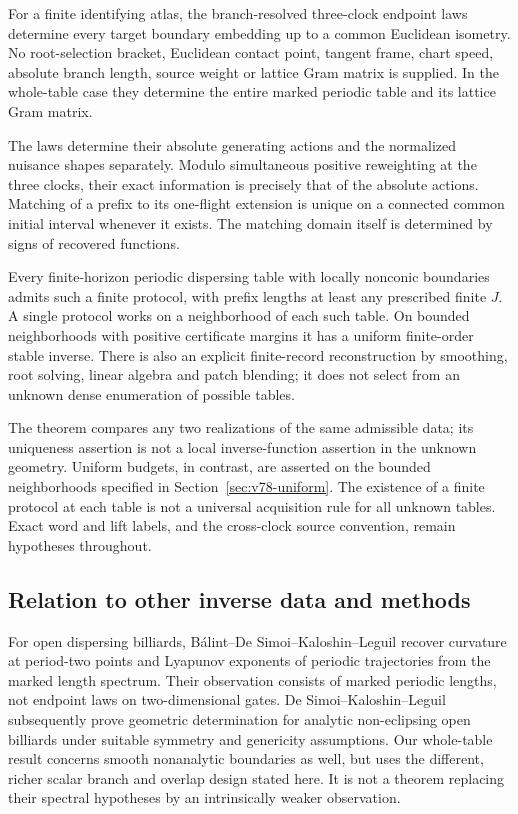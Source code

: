 \begin{theorem}
\label{thm:v78-main}\label{thm:v77-main}
For a finite identifying atlas, the branch-resolved three-clock endpoint
laws determine every target boundary embedding up to a common Euclidean
isometry.  No root-selection bracket, Euclidean contact point, tangent
frame, chart speed, absolute branch length, source weight or lattice
Gram matrix is supplied.  In the whole-table case they determine the
entire marked periodic table and its lattice Gram matrix.

The laws determine their absolute generating actions and the normalized
nuisance shapes separately.  Modulo simultaneous positive reweighting
at the three clocks, their exact information is precisely that of the
absolute actions.  Matching of a prefix to its one-flight extension is
unique on a connected common initial interval whenever it exists.
The matching domain itself is determined by signs of recovered functions.

Every finite-horizon periodic dispersing table with locally nonconic
boundaries admits such a finite protocol, with prefix lengths at least
any prescribed finite $J$.  A single protocol works on a neighborhood
of each such table.  On bounded neighborhoods with positive certificate
margins it has a uniform finite-order stable inverse.  There is also an
explicit finite-record reconstruction by smoothing, root solving,
linear algebra and patch blending; it does not select from an unknown
dense enumeration of possible tables.
\end{theorem}

The theorem compares any two realizations of the same admissible data;
its uniqueness assertion is not a local inverse-function assertion in
the unknown geometry.  Uniform budgets, in contrast, are asserted on the
bounded neighborhoods specified in Section~\ref{sec:v78-uniform}.
The existence of a finite protocol at each table is not a universal
acquisition rule for all unknown tables.  Exact word and lift labels,
and the cross-clock source convention, remain hypotheses throughout.

\subsection{Relation to other inverse data and methods}

For open dispersing billiards, B\'alint--De Simoi--Kaloshin--Leguil
\cite{BalintDeSimoiKaloshinLeguil2020} recover curvature at period-two
points and Lyapunov exponents of periodic trajectories from the marked
length spectrum.  Their observation consists of marked periodic lengths,
not endpoint laws on two-dimensional gates.  De Simoi--Kaloshin--Leguil
\cite{DeSimoiKaloshinLeguil2023} subsequently prove geometric determination
for analytic non-eclipsing open billiards under suitable symmetry and
genericity assumptions.  Our whole-table result concerns smooth
nonanalytic boundaries as well, but uses the different, richer scalar
branch and overlap design stated here.  It is not a theorem replacing
their spectral hypotheses by an intrinsically weaker observation.

